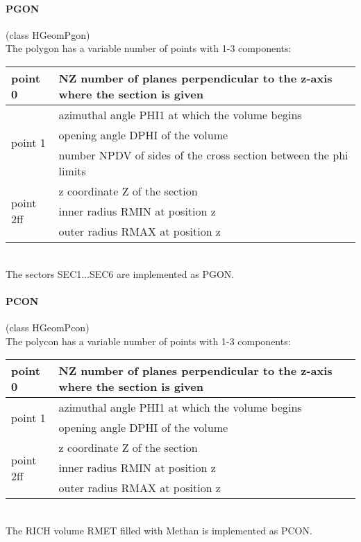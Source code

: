 \paragraph{PGON} (class HGeomPgon)\\
The polygon has a variable number of points with 1-3 components:\\
\begin{tabular}{|l|l|}
  \hline
  point 0                    & NZ number of planes perpendicular to the z-axis where the section is given\\
  \hline
  \multirow{3}{*}{point 1}   & azimuthal angle PHI1 at which the volume begins\\
                             & opening angle DPHI of the volume\\
                             & number NPDV of sides of the cross section between the phi limits\\
  \hline
  \multirow{3}{*}{point 2ff} & z coordinate Z of the section\\
                             & inner radius RMIN at position z\\ 
                             & outer radius RMAX at position z\\
  \hline
\end{tabular}\\[1.5px]
The sectors SEC1...SEC6 are implemented as PGON.

\paragraph{PCON} (class HGeomPcon)\\
The polycon has a variable number of points with 1-3 components:\\
\begin{tabular}{|l|l|}
  \hline
   point 0                   & NZ number of planes perpendicular to the z-axis where the section is given\\
  \hline
  \multirow{2}{*}{point 1}   & azimuthal angle PHI1 at which the volume begins\\ 
                             & opening angle DPHI of the volume\\
  \hline
  \multirow{3}{*}{point 2ff} & z coordinate Z of the section\\
                             & inner radius RMIN at position z\\
                             & outer radius RMAX at position z\\
  \hline
\end{tabular}\\[1.5px]
The RICH volume RMET filled with Methan is implemented as PCON.

